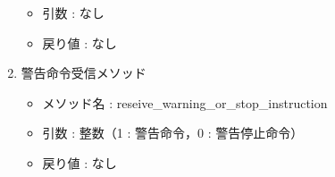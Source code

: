 \begin{enumerate}
\begin{itemize}
	\item 引数 : なし
	\item 戻り値 : なし \\
	\end{itemize}
\item 警告命令受信メソッド
	\begin{itemize}
	\item メソッド名 : reseive\_warning\_or\_stop\_instruction
	\item 引数 : 整数（1 : 警告命令，0 : 警告停止命令）
	\item 戻り値 : なし \\
	\end{itemize}
\end{enumerate}

